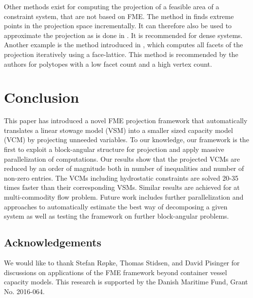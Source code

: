 \documentclass{llncs}
\begin{document}
Other methods exist for computing the projection of a feasible area of a constraint system, that are not based on FME. The method in \cite{huynh92} finds extreme points in the projection space incrementally. It can therefore also be used to approximate the projection as is done in \cite{simon05}. It is recommended for dense systems. Another example is the method introduced in \cite{jones04}, which computes all facets of the projection iteratively using a face-lattice. This method is recommended by the authors for polytopes with a low facet count and a high vertex count.

\section{Conclusion}\label{sec:conclusion}
This paper has introduced a novel FME projection framework that automatically translates a linear stowage model (VSM) into a smaller sized capacity model (VCM) by projecting unneeded variables. To our knowledge, our framework is the first to exploit a block-angular structure for projection and apply massive parallelization of computations. Our results show that the projected VCMs are reduced by an order of magnitude both in number of inequalities and number of non-zero entries. The VCMs including hydrostatic constraints are solved 20-35 times faster than their corresponding VSMs. Similar results are achieved for at multi-commodity flow problem. Future work includes further parallelization and approaches to automatically estimate the best way of decomposing a given system as well as testing the framework on further block-angular problems.

\subsection*{Acknowledgements}
We would like to thank Stefan R{\o}pke, Thomas Stidsen, and David Pisinger for discussions on applications of the FME framework beyond container vessel capacity models. This research is supported by the Danish Maritime Fund, Grant No. 2016-064.



\end{document}

